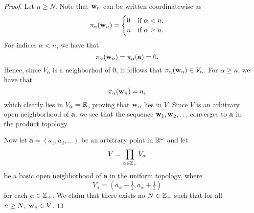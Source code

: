 \begin{solution}
\begin{proof}
        Let $n \geq N$.
        Note that $\mathbf{w}_n$ can be written coordinatewise as
        \begin{equation*}
            \pi_\alpha(\mathbf{w}_n) = \begin{cases}
                0   & \text{if } \alpha < n, \\
                n   & \text{if } \alpha \geq n.
            \end{cases}
        \end{equation*}
        For indices $\alpha < n$, we have that
        \begin{equation*}
            \pi_\alpha(\mathbf{w}_n) = \pi_\alpha(\mathbf{a}) = 0.
        \end{equation*}
        Hence, since $V_\alpha$ is a neighborhod of $0$, it follows that $\pi_\alpha(\mathbf{w}_n) \in V_\alpha$.
        For $\alpha \geq n$, we have that
        \begin{equation*}
            \pi_\alpha(\mathbf{w}_n) = n,
        \end{equation*}
        which clearly lies in $V_\alpha = \mathbb{R}$, proving that $\mathbf{w}_n$ lies in $V$.
        Since $V$ is an arbitrary open neighborhood of $\mathbf{a}$, we see that the sequence $\mathbf{w}_1, \mathbf{w}_2, \ldots$ converges to $\mathbf{a}$ in the product topology.

        Now let $\mathbf{a} = (a_1, a_2, \ldots)$ be an arbitrary point in $\mathbb{R}^\omega$ and let
        \begin{equation*}
            V = \prod_{\alpha \in \mathbb{Z}_+} V_\alpha
        \end{equation*}
        be a basic open neighborhood of $\mathbf{a}$ in the uniform topology, where
        \begin{equation*}
            V_\alpha = (a_\alpha - \tfrac{1}{2}, a_\alpha + \tfrac{1}{2})
        \end{equation*}
        for each $\alpha \in \mathbb{Z}_+$.
        We claim that there exists no $N \in \mathbb{Z}_+$ such that for all $n \geq N,~ \mathbf{w}_n \in V$.


\end{proof}
\end{solution}
